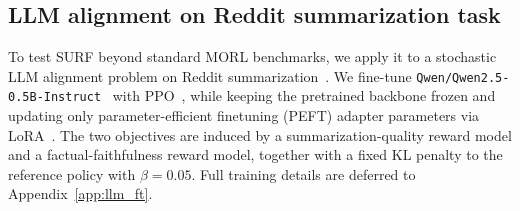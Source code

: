 \documentclass{article}
\begin{document}
\vspace{-0.2cm}
\subsection{LLM alignment on Reddit summarization task} 
\label{sec:llm}
\vspace{-0.2cm}
To test SURF beyond standard MORL benchmarks, we apply it to a stochastic LLM alignment problem on Reddit summarization~\citep{volske2017tl,stiennon2020learning}. 
We fine-tune \texttt{Qwen/Qwen2.5-0.5B-Instruct}~\citep{qwen2025qwen25technicalreport} with PPO~\citep{schulman2017proximal}, while keeping the pretrained backbone frozen and updating only parameter-efficient finetuning (PEFT) adapter parameters via LoRA~\citep{hu2022lora}. 
The two objectives are induced by a summarization-quality reward model and a factual-faithfulness reward model, together with a fixed KL penalty to the reference policy with $\beta = 0.05$. 
Full training details are deferred to Appendix~\ref{app:llm_ft}.
\end{document}
